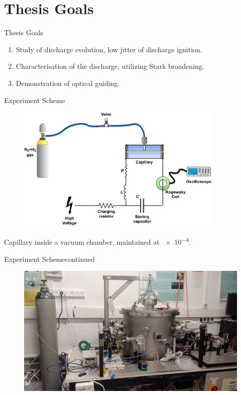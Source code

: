 \documentclass[dvipsnames]{beamer}
\begin{document}
\section{Thesis Goals}
\begin{frame}{Thesis Goals}
 \begin{enumerate}
\item Study of discharge evolution, low jitter of discharge ignition.
\item Characterisation of the discharge, utilizing Stark broadening.
\item Demonstration of optical guiding.
 \end{enumerate}
\end{frame}
\begin{frame}{Experiment Scheme}
\begin{figure}
 \includegraphics[height=170pt]{figures/results/jitter/discharge_scheme.pdf}
\end{figure}
Capillary inside a vacuum chamber, maintained at \SI{e-4}{\torr}.
\end{frame}
\begin{frame}{Experiment Scheme}{continued}
\begin{figure}
 \includegraphics[width=\textwidth]{figures/results/jitter/system_picture.jpg}
\end{figure}
\end{frame}
\end{document}
